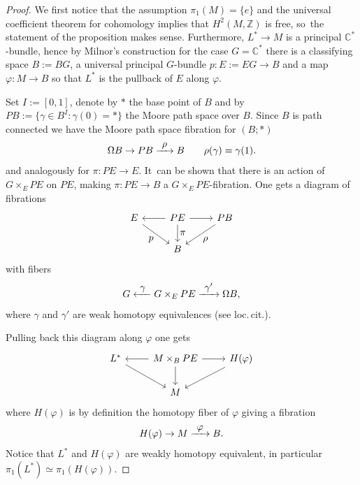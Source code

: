 \documentclass[JEP,XML,SOM,Unicode,published]{cedram}
\let\ts\textstyle
\newcommand{\To}[1]{\mathchoice{\xrightarrow{\textstyle\kern4pt#1\kern3pt}}{\xrightarrow{\,#1\,}}{}{}}
\newcommand{\From}[1]{\mathchoice{\xleftarrow{\textstyle~#1~}}{\xleftarrow{\,#1\,}}{}{}}
\let\ra\rightarrow
\begin{document}
\begin{proof}
We first notice that the assumption $\pi_1(M) = \{e\}$ and the universal coefficient theorem for cohomology implies that $H^2(M,\mathbb{Z})$ is free, so~the statement of the proposition makes sense. Furthermore, $L^* \to M$ is a principal $\mathbb{C}^*$-bundle, hence by Milnor's construction \cite{Milnor} for the case $G= \mathbb{C}^*$ there is a classifying space $B:= BG$, a universal principal $G$-bundle $p: E:= EG \ra B$ and a map $\varphi: M \ra B$ so that $L^*$ is the pullback of $E$ along $\varphi$.

Set $I :=[0,1]$, denote by $\ast$ the base point of $B$ and by $PB := \{ \gamma \in B^I : \gamma(0) = \ast\}$ the Moore path space over $B$. Since $B$ is path connected
we have the Moore path space fibration for $(B;*)$
\[
\Omega B \to PB \To{\rho} B \qquad \rho(\gamma) = \gamma(1).
\]
and analogously for $\pi: PE \ra E$. It~can be shown \cite[Prop.\,2.10]{FHT} that there is an action of $G \times_E PE$ on $PE$, making $ \pi:PE \to B$ a $G \times_E PE$-fibration. One gets a diagram of fibrations
\[
\begin{tikzcd}
E \arrow[dr, "\ts p"']
& PE \arrow[d, "\ts \pi"] \arrow[r] \arrow[l]
& PB \arrow[dl, "\ts \rho"] \\ 
& B &
\end{tikzcd}
\]
with fibers
\[
G\From{\gamma} G \times_E PE\To{\gamma'}\Omega B,
\]
where $\gamma$ and $\gamma'$ are weak homotopy equivalences (see loc.\,cit.).

Pulling back this diagram along $\varphi$ one gets
\[
\begin{tikzcd}
L^* \arrow[dr] & M \times_B PE \arrow[l] \arrow[r] \arrow[d] & H(\varphi) \arrow[dl] \\
& M &
\end{tikzcd}
\]
where $H(\varphi)$ is by definition the homotopy fiber of $\varphi$ giving a fibration
\[
H(\varphi) \to M \To{\varphi} B.
\]
Notice that $L^*$ and $H(\varphi)$ are weakly homotopy equivalent, in particular $\pi_1(L^*) \simeq \pi_1(H(\varphi))$.


\end{proof}
\end{document}
